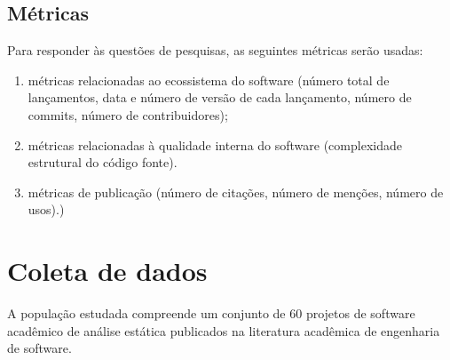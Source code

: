 

\subsection{Métricas}

Para responder às questões de pesquisas, as seguintes métricas serão usadas:
\begin{enumerate}
\item métricas relacionadas ao ecossistema do software (número
total de lançamentos, data e número de versão de cada lançamento, número de
commits, número de contribuidores); %
\item métricas relacionadas à qualidade interna do software (complexidade estrutural do código fonte). %
\item métricas de publicação (número de citações, número de menções, número de usos).) %
\end{enumerate}



\section{Coleta de dados} \label{sec:study1:operation}

A população estudada compreende um conjunto de 60 projetos de software
acadêmico de análise estática publicados na literatura acadêmica de engenharia
de software.

